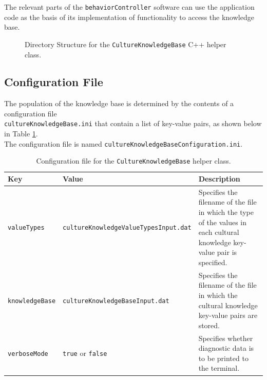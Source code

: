 \documentclass{CSSRforAfrica}
\begin{document}
The relevant parts of the {\small \tt behaviorController} software can use the application code as the basis of its implementation of functionality to access the knowledge base.



\begin{figure}[thb]
\caption{Directory Structure for the {\tt \small CultureKnowledgeBase}  C++ helper class.}
\label{fig:directory_structure_utilities}
\end{figure}


\newpage

\subsection{Configuration File}
The population of the knowledge base is determined by the contents of a configuration file\\
{\tt \small cultureKnowledgeBase.ini}  that  contain a list of key-value pairs, as shown below in Table \ref{tab:config_file}.\\

\noindent
The configuration file is named {\tt\small cultureKnowledgeBaseConfiguration.ini}.

 
\begin{table} [H]
\caption{Configuration file for the {\tt \small CultureKnowledgeBase} helper class.} 
\label{tab:config_file}
\begin{tabularx}{\linewidth}{|l|l|X|}
    \hline
    \rowcolor{gray!30}
    \small{\textbf{Key}} & \small{\textbf{Value}} & \small{\textbf{Description}} \\ \hline
    \footnotesize{\texttt{valueTypes}} & \footnotesize{\texttt{cultureKnowledgeValueTypesInput.dat}}  & \footnotesize{Specifies the filename of the file in which the type of the values in each cultural knowledge key-value pair  is specified.} \\ \hline
    \footnotesize{\texttt{knowledgeBase}} & \footnotesize{\texttt{cultureKnowledgeBaseInput.dat}}  & \footnotesize{Specifies the filename of the file in which the cultural knowledge key-value pairs  are stored.} \\ \hline
    \footnotesize{\texttt{verboseMode}} & \footnotesize{\texttt{true}} or \texttt{false} & \footnotesize{Specifies whether diagnostic data is to be printed to the terminal.} \\ \hline
\end{tabularx}
\end{table}
\end{document}
